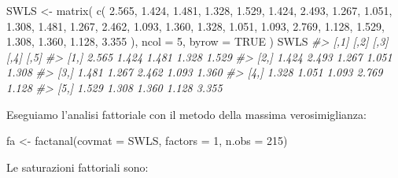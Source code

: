 \documentclass[
  11pt,
]{krantz}
\makeatletter
\newenvironment{Shaded}{\begin{snugshade}}{\end{snugshade}}
\newcommand{\AttributeTok}[1]{\textcolor[rgb]{0.61,0.61,0.61}{#1}}
\newcommand{\CommentTok}[1]{\textcolor[rgb]{0.37,0.37,0.37}{\textit{#1}}}
\newcommand{\ConstantTok}[1]{\textcolor[rgb]{0,0,0}{#1}}
\newcommand{\DecValTok}[1]{\textcolor[rgb]{0.06,0.06,0.06}{#1}}
\newcommand{\FloatTok}[1]{\textcolor[rgb]{0.06,0.06,0.06}{#1}}
\newcommand{\FunctionTok}[1]{\textcolor[rgb]{0,0,0}{#1}}
\newcommand{\NormalTok}[1]{#1}
\newcommand{\OtherTok}[1]{\textcolor[rgb]{0.37,0.37,0.37}{#1}}
\newcommand{\SpecialCharTok}[1]{\textcolor[rgb]{0,0,0}{#1}}
\newenvironment{kframe}{%
\medskip{}
\setlength{\fboxsep}{.8em}
 \def\at@end@of@kframe{}%
 \ifinner\ifhmode%
  \def\at@end@of@kframe{\end{minipage}}%
  \begin{minipage}{\columnwidth}%
 \fi\fi%
 \def\FrameCommand##1{\hskip\@totalleftmargin \hskip-\fboxsep
 \colorbox{shadecolor}{##1}\hskip-\fboxsep
     \hskip-\linewidth \hskip-\@totalleftmargin \hskip\columnwidth}%
 \MakeFramed {\advance\hsize-\width
   \@totalleftmargin\z@ \linewidth\hsize
   \@setminipage}}%
 {\par\unskip\endMakeFramed%
 \at@end@of@kframe}
\renewenvironment{Shaded}{\begin{kframe}}{\end{kframe}}
\theoremstyle{definition}
\theoremstyle{definition}
\theoremstyle{definition}
\theoremstyle{definition}
\theoremstyle{remark}
\makeatother
\begin{document}
\begin{Shaded}
\begin{Highlighting}[]
\NormalTok{SWLS }\OtherTok{\textless{}{-}} \FunctionTok{matrix}\NormalTok{(}
  \FunctionTok{c}\NormalTok{(}
    \FloatTok{2.565}\NormalTok{, }\FloatTok{1.424}\NormalTok{, }\FloatTok{1.481}\NormalTok{, }\FloatTok{1.328}\NormalTok{, }\FloatTok{1.529}\NormalTok{,}
    \FloatTok{1.424}\NormalTok{, }\FloatTok{2.493}\NormalTok{, }\FloatTok{1.267}\NormalTok{, }\FloatTok{1.051}\NormalTok{, }\FloatTok{1.308}\NormalTok{,}
    \FloatTok{1.481}\NormalTok{, }\FloatTok{1.267}\NormalTok{, }\FloatTok{2.462}\NormalTok{, }\FloatTok{1.093}\NormalTok{, }\FloatTok{1.360}\NormalTok{,}
    \FloatTok{1.328}\NormalTok{, }\FloatTok{1.051}\NormalTok{, }\FloatTok{1.093}\NormalTok{, }\FloatTok{2.769}\NormalTok{, }\FloatTok{1.128}\NormalTok{,}
    \FloatTok{1.529}\NormalTok{, }\FloatTok{1.308}\NormalTok{, }\FloatTok{1.360}\NormalTok{, }\FloatTok{1.128}\NormalTok{, }\FloatTok{3.355}
\NormalTok{  ),}
  \AttributeTok{ncol =} \DecValTok{5}\NormalTok{, }\AttributeTok{byrow =} \ConstantTok{TRUE}
\NormalTok{)}
\NormalTok{SWLS}
\CommentTok{\#\textgreater{}       [,1]  [,2]  [,3]  [,4]  [,5]}
\CommentTok{\#\textgreater{} [1,] 2.565 1.424 1.481 1.328 1.529}
\CommentTok{\#\textgreater{} [2,] 1.424 2.493 1.267 1.051 1.308}
\CommentTok{\#\textgreater{} [3,] 1.481 1.267 2.462 1.093 1.360}
\CommentTok{\#\textgreater{} [4,] 1.328 1.051 1.093 2.769 1.128}
\CommentTok{\#\textgreater{} [5,] 1.529 1.308 1.360 1.128 3.355}
\end{Highlighting}
\end{Shaded}

Eseguiamo l'analisi fattoriale con il metodo della massima verosimiglianza:

\begin{Shaded}
\begin{Highlighting}[]
\NormalTok{fa }\OtherTok{\textless{}{-}} \FunctionTok{factanal}\NormalTok{(}\AttributeTok{covmat =}\NormalTok{ SWLS, }\AttributeTok{factors =} \DecValTok{1}\NormalTok{, }\AttributeTok{n.obs =} \DecValTok{215}\NormalTok{)}
\end{Highlighting}
\end{Shaded}

Le saturazioni fattoriali sono:

\begin{Shaded}
\end{Shaded}
\end{document}
